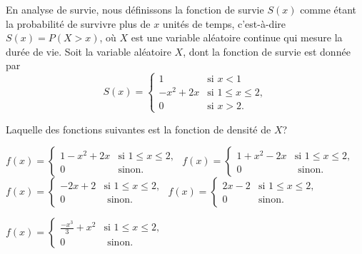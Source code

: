 \begin{questions}
\pageblanche

\question[3] En analyse de survie, nous définissons la fonction de survie $S(x)$ comme étant la probabilité de survivre plus de $x$ unités de temps, c'est-à-dire $S(x)=P(X>x)$, où $X$ est une variable aléatoire continue qui mesure la durée de vie.  Soit la variable aléatoire $X$, dont la fonction de survie est donnée par 
\[ S(x) =
\begin{cases}
1 & \text{si } x<1\\
   \displaystyle -x^2+2x& \text{si } 1\leq x\leq 2, \\
    0 & \text{si } x>2.
\end{cases}
\]

Laquelle des fonctions suivantes est la fonction de densité de $X$?

\begin{checkboxes}
\choice $f(x)=\left\{
			\begin{array}{ll}
   \displaystyle 1-x^2+2x& \text{si } 1\leq x\leq 2, \\
			0 & \mbox{sinon.}
			\end{array}
			\right. $
		\vspace{0.3cm}
\correctchoice $ f(x) = \left\{
			\begin{array}{ll}
   \displaystyle 1+x^2-2x& \text{si } 1\leq x\leq 2, \\
			0 & \mbox{ sinon.}
			\end{array}
			\right. $
   		\vspace{0.3cm}
\choice $ f(x) = \left\{
			\begin{array}{ll}
   \displaystyle -2x+2& \text{si } 1\leq x\leq 2, \\
			0 & \mbox{ sinon.}
			\end{array}
			\right. $
   		\vspace{0.3cm}
\choice $ f(x) = \left\{
			\begin{array}{ll}
   \displaystyle 2x-2& \text{si } 1\leq x\leq 2, \\
			0 & \mbox{sinon.}
			\end{array}
			\right. $
   		\vspace{0.3cm}

\choice $ f(x) = \left\{
			\begin{array}{ll}
   \displaystyle \frac{-x^3}{3}+x^2& \text{si } 1\leq x\leq 2, \\

			0 &  \mbox{ sinon. }
			\end{array}
			\right. $


\end{checkboxes}
\end{questions}
